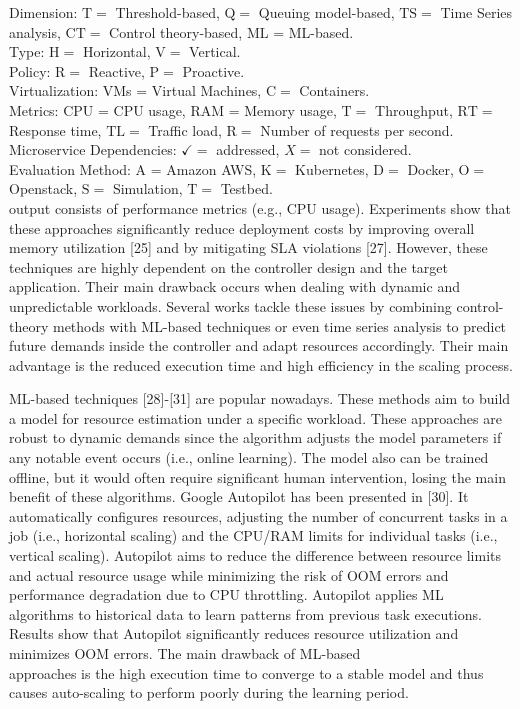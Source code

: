 \documentclass[10pt]{article}
\begin{document}
Dimension: $\mathrm{T}=$ Threshold-based, $\mathrm{Q}=$ Queuing model-based, $\mathrm{TS}=$ Time Series analysis, $\mathrm{CT}=$ Control theory-based, ML = ML-based.\\
Type: $\mathrm{H}=$ Horizontal, $\mathrm{V}=$ Vertical.\\
Policy: $\mathrm{R}=$ Reactive, $\mathrm{P}=$ Proactive.\\
Virtualization: VMs = Virtual Machines, $\mathrm{C}=$ Containers.\\
Metrics: CPU = CPU usage, RAM = Memory usage, $\mathrm{T}=$ Throughput, $\mathrm{RT}=$ Response time, $\mathrm{TL}=$ Traffic load, $\mathrm{R}=$ Number of requests per second. Microservice Dependencies: $\checkmark=$ addressed, $X=$ not considered.\\
Evaluation Method: A = Amazon AWS, $\mathrm{K}=$ Kubernetes, $\mathrm{D}=$ Docker, $\mathrm{O}=$ Openstack, $\mathrm{S}=$ Simulation, $\mathrm{T}=$ Testbed.\\[0pt]
output consists of performance metrics (e.g., CPU usage). Experiments show that these approaches significantly reduce deployment costs by improving overall memory utilization [25] and by mitigating SLA violations [27]. However, these techniques are highly dependent on the controller design and the target application. Their main drawback occurs when dealing with dynamic and unpredictable workloads. Several works tackle these issues by combining control-theory methods with ML-based techniques or even time series analysis to predict future demands inside the controller and adapt resources accordingly. Their main advantage is the reduced execution time and high efficiency in the scaling process.

ML-based techniques [28]-[31] are popular nowadays. These methods aim to build a model for resource estimation under a specific workload. These approaches are robust to dynamic demands since the algorithm adjusts the model parameters if any notable event occurs (i.e., online learning). The model also can be trained offline, but it would often require significant human intervention, losing the main benefit of these algorithms. Google Autopilot has been presented in [30]. It automatically configures resources, adjusting the number of concurrent tasks in a job (i.e., horizontal scaling) and the CPU/RAM limits for individual tasks (i.e., vertical scaling). Autopilot aims to reduce the difference between resource limits and actual resource usage while minimizing the risk of OOM errors and performance degradation due to CPU throttling. Autopilot applies ML algorithms to historical data to learn patterns from previous task executions. Results show that Autopilot significantly reduces resource utilization and minimizes OOM errors. The main drawback of ML-based\\
approaches is the high execution time to converge to a stable model and thus causes auto-scaling to perform poorly during the learning period.
\end{document}
